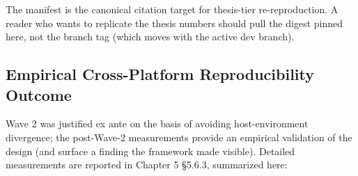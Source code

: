 \begin{Shaded}
\begin{Highlighting}[]
\FunctionTok{\{}
  \FunctionTok{:} \FunctionTok{\{}
    \FunctionTok{:} \FunctionTok{,}
    \FunctionTok{:} \FunctionTok{,}
    \FunctionTok{:} \FunctionTok{,}
    \FunctionTok{:} \FunctionTok{,}
    \FunctionTok{:} \FunctionTok{,}
    \FunctionTok{:} \FunctionTok{\{}
      \FunctionTok{:} \FunctionTok{,}
      \FunctionTok{:} \FunctionTok{,}
      \FunctionTok{:} 
    \FunctionTok{\}}
  \FunctionTok{\}}
\FunctionTok{\}}
\end{Highlighting}
\end{Shaded}

The manifest is the canonical citation target for thesis-tier
re-reproduction. A reader who wants to replicate the thesis numbers
should pull the digest pinned here, not the branch tag (which moves with
the active dev branch).

\subsection{Empirical Cross-Platform Reproducibility
Outcome}\label{3116-empirical-cross-platform-reproducibility-outcome}

Wave 2 was justified ex ante on the basis of avoiding host-environment
divergence; the post-Wave-2 measurements provide an empirical validation
of the design (and surface a finding the framework made visible).
Detailed measurements are reported in Chapter 5 §5.6.3, summarized here:

